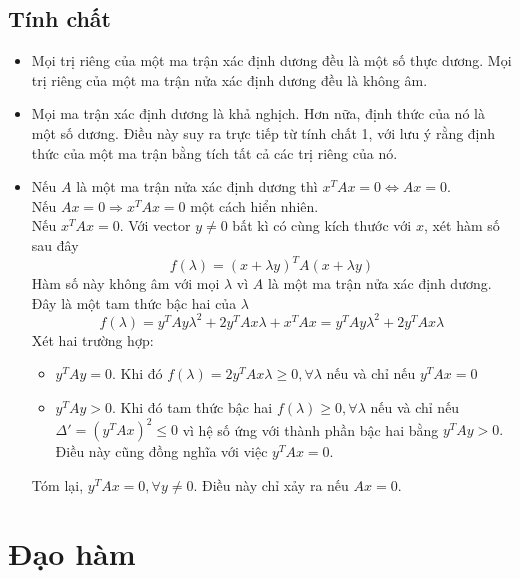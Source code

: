 \documentclass[12pt,a4paper]{report}
\begin{document}
\subsection{Tính chất}
\begin{itemize}
	\item Mọi trị riêng của một ma trận xác định dương đều là một số thực dương.  Mọi trị riêng của một ma trận nửa xác định dương đều là không âm.\item Mọi ma trận xác định dương là khả nghịch.  Hơn nữa, định thức của nó là một số dương. Điều này suy ra trực tiếp từ tính chất 1, với lưu ý rằng định thức của một ma trận bằng tích tất cả các trị riêng của nó.
	\item Nếu $A$ là một ma trận nửa xác định dương thì $x^TAx = 0 \Leftrightarrow Ax = 0.$ \\Nếu $Ax = 0 \Rightarrow x^TAx = 0$ một cách hiển nhiên.\\ Nếu $x^TAx = 0$. Với vector $y \neq 0$ bất kì có cùng kích thước với $x$, xét hàm số sau đây $$f(\lambda) = (x+\lambda y)^TA(x+ \lambda y)$$ Hàm số này không âm với mọi $\lambda$ vì $A$ là một ma trận nửa xác định dương. Đây là một tam thức bậc hai của $\lambda$ $$f(\lambda) = y^TAy\lambda^2 + 2y^TAx\lambda + x^TAx = y^TAy\lambda^2 + 2y^TAx\lambda$$ Xét hai trường hợp: 
	\begin{itemize}
		\item $y^TAy = 0$. Khi đó $f(\lambda) = 2y^TAx\lambda \geq 0, \forall \lambda$ nếu và chỉ nếu $y^TAx = 0$
		\item $y^TAy > 0$. Khi đó tam thức bậc hai $f(\lambda) \geq 0, \forall \lambda$ nếu và chỉ nếu $\Delta' = (y^TAx)^2 \leq 0$ vì hệ số ứng với thành phần bậc hai bằng $y^TAy > 0.$ Điều này cũng đồng nghĩa với việc $y^TAx = 0$.
	\end{itemize}
Tóm lại, $y^TAx = 0, \forall y \neq 0$. Điều này chỉ xảy ra nếu $Ax = 0$.
\end{itemize}
\section{Đạo hàm}
\end{document}
